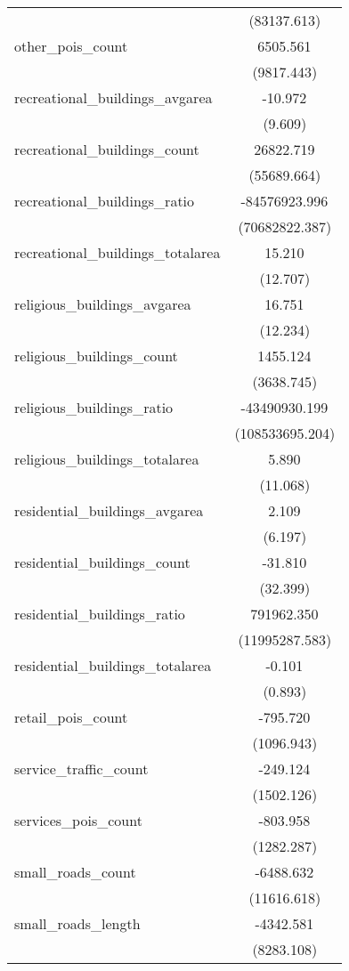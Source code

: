 \begin{table}[!htbp]
\begin{tabular}{@{\extracolsep{5pt}}lc}
  & (83137.613) \\
 other_pois_count & 6505.561$^{}$ \\
  & (9817.443) \\
 recreational_buildings_avgarea & -10.972$^{}$ \\
  & (9.609) \\
 recreational_buildings_count & 26822.719$^{}$ \\
  & (55689.664) \\
 recreational_buildings_ratio & -84576923.996$^{}$ \\
  & (70682822.387) \\
 recreational_buildings_totalarea & 15.210$^{}$ \\
  & (12.707) \\
 religious_buildings_avgarea & 16.751$^{}$ \\
  & (12.234) \\
 religious_buildings_count & 1455.124$^{}$ \\
  & (3638.745) \\
 religious_buildings_ratio & -43490930.199$^{}$ \\
  & (108533695.204) \\
 religious_buildings_totalarea & 5.890$^{}$ \\
  & (11.068) \\
 residential_buildings_avgarea & 2.109$^{}$ \\
  & (6.197) \\
 residential_buildings_count & -31.810$^{}$ \\
  & (32.399) \\
 residential_buildings_ratio & 791962.350$^{}$ \\
  & (11995287.583) \\
 residential_buildings_totalarea & -0.101$^{}$ \\
  & (0.893) \\
 retail_pois_count & -795.720$^{}$ \\
  & (1096.943) \\
 service_traffic_count & -249.124$^{}$ \\
  & (1502.126) \\
 services_pois_count & -803.958$^{}$ \\
  & (1282.287) \\
 small_roads_count & -6488.632$^{}$ \\
  & (11616.618) \\
 small_roads_length & -4342.581$^{}$ \\
  & (8283.108) \\

\end{tabular}
\end{table}
